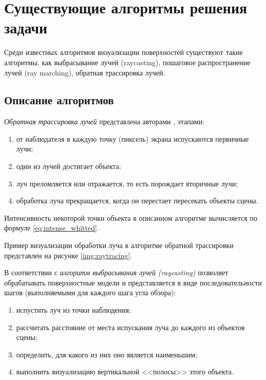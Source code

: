 \section{Существующие алгоритмы решения задачи}

Среди известных алгоритмов визуализации поверхностей существуют такие алгоритмы, как выбрасывание лучей (raycasting), пошаговое распространение лучей (ray marching), обратная трассировка лучей.

\subsection{Описание алгоритмов}

\textit{Обратная трассировка лучей} представлена авторами \cite{порев2002компьютерная}, \cite{демин2011} этапами:
\begin{enumerate}
	\item от наблюдателя в каждую точку (пиксель) экрана испускаются первичные лучи;
	\item один из лучей достигает объекта;
	\item луч преломляется или отражается, то есть порождает вторичные лучи;
	\item обработка луча прекращается, когда он перестает пересекать объекты сцены.
\end{enumerate}

Интенсивность некоторой точки объекта в описанном алгоритме вычисляется по формуле \ref{eq:intense_whitted}.

Пример визуализации обработки луча в алгоритме обратной трассировки представлен на рисунке \ref{img:raytracing}.


В соответствии с \cite{евстратов2020создание} \textit{алгоритм выбрасывания лучей (raycasting)} позволяет обрабатывать поверхностные модели и представляется в виде последовательности шагов (выполняемыми для каждого шага угла обзора):
\begin{enumerate}
	\item испустить луч из точки наблюдения;
	\item рассчитать расстояние от места испускания луча до каждого из объектов сцены;
	\item определить, для какого из них оно является наименьшим;
	\item выполнить визуализацию вертикальной <<полосы>> этого объекта.
\end{enumerate}

